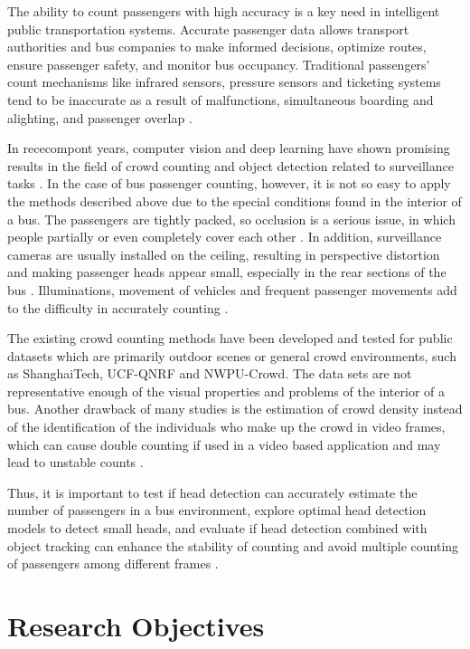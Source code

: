 The ability to count passengers with high accuracy is a key need in intelligent public transportation systems. Accurate passenger data allows transport authorities and bus companies to make informed decisions, optimize routes, ensure passenger safety, and monitor bus occupancy. Traditional passengers' count mechanisms like infrared sensors, pressure sensors and ticketing systems tend to be inaccurate as a result of malfunctions, simultaneous boarding and alighting, and passenger overlap \cite{Aleksander2024}.

In rececompont years, computer vision and deep learning have shown promising results in the field of crowd counting and object detection related to surveillance tasks \cite{sindagi2022survey}. In the case of bus passenger counting, however, it is not so easy to apply the methods described above due to the special conditions found in the interior of a bus. The passengers are tightly packed, so occlusion is a serious issue, in which people partially or even completely cover each other \cite{sundararaman2021}. In addition, surveillance cameras are usually installed on the ceiling, resulting in perspective distortion and making passenger heads appear small, especially in the rear sections of the bus \cite{rapid2020}. Illuminations, movement of vehicles and frequent passenger movements add to the difficulty in accurately counting \cite{Claire2021}.

The existing crowd counting methods have been developed and tested for public datasets which are primarily outdoor scenes or general crowd environments, such as ShanghaiTech\cite{Zhu2020}, UCF-QNRF\cite{ucf_qnrf_dataset} and NWPU-Crowd\cite{wang2020nwpu}. The data sets are not representative enough of the visual properties and problems of the interior of a bus. Another drawback of many studies is the estimation of crowd density instead of the identification of the individuals who make up the crowd in video frames, which can cause double counting if used in a video based application and may lead to unstable counts \cite{hassan2023crowd}.

Thus, it is important to test if head detection can accurately estimate the number of passengers in a bus environment, explore optimal head detection models to detect small heads, and evaluate if head detection combined with object tracking can enhance the stability of counting and avoid multiple counting of passengers among different frames \cite{occupancy2026mot}.

\section{Research Objectives}

